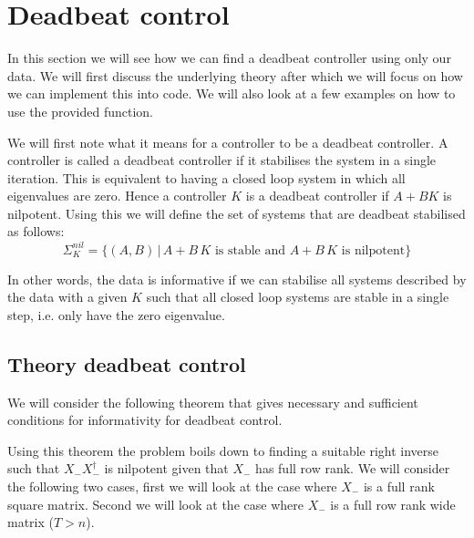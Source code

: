 \section{Deadbeat control}
In this section we will see how we can find a deadbeat controller using only our data. We will first discuss the underlying theory after which we will focus on how we can implement this into code. We will also look at a few examples on how to use the provided function.

We will first note what it means for a controller to be a deadbeat controller. A controller is called a deadbeat controller if it stabilises the system in a single iteration. This is equivalent to having a closed loop system in which all eigenvalues are zero. Hence a controller $K$ is a deadbeat controller if $A + BK$ is nilpotent. Using this we will define the set of systems that are deadbeat stabilised as follows:
\begin{equation*}
	\Sigma_K^{nil} = \{ (A,B) \, | \, A + B \, K \mbox{ is stable and } A + B \, K \mbox{ is nilpotent} \}
\end{equation*}


In other words, the data is informative if we can stabilise all systems described by the data with a given $K$ such that all closed loop systems are stable in a single step, i.e. only have the zero eigenvalue.

\subsection{Theory deadbeat control}
We will consider the following theorem that gives necessary and sufficient conditions for informativity for deadbeat control.


Using this theorem the problem boils down to finding a suitable right inverse such that $X_- X_-^\dagger$ is nilpotent given that $X_-$ has full row rank. We will consider the following two cases, first we will look at the case where $X_-$ is a full rank square matrix. Second we will look at the case where $X_-$ is a full row rank wide matrix ($T > n$).
 
